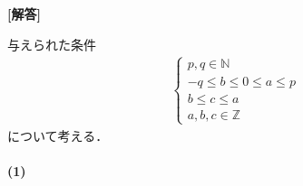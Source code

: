 \documentclass[../../main.tex]{subfiles}
\begin{document}
\begin{oframed}
  
\end{oframed}

{\bf [解答]}

与えられた条件
\begin{align}
  \begin{cases}
    p, q \in \mathbb{N} \\
    -q \le b \le 0 \le a \le p \\
    b \le c \le a \\
    a, b, c \in \mathbb{Z}
  \end{cases} \label{eq:1}
\end{align}
について考える．

\paragraph{(1)}
\end{document}
